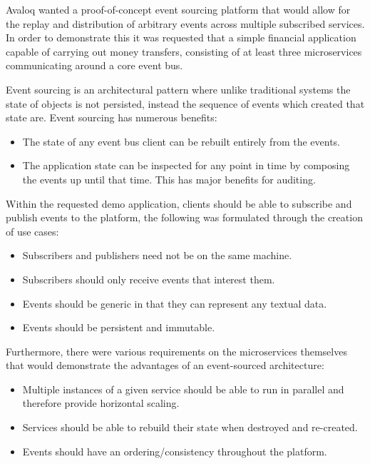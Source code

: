 \documentclass{l3proj}
\begin{document}
Avaloq wanted a proof-of-concept event sourcing platform that would allow for the replay and distribution of arbitrary events across multiple subscribed services. In order to demonstrate this it was requested that a simple financial application capable of carrying out money transfers, consisting of at least three microservices communicating around a core event bus.

Event sourcing is an architectural pattern where unlike traditional systems the state of objects is not persisted, instead the sequence of events which created that state are. Event sourcing has numerous benefits:

\begin{itemize}
    \item The state of any event bus client can be rebuilt entirely from the events.
    \item The application state can be inspected for any point in time by composing the events up until that time. This has major benefits for auditing.
\end{itemize}

Within the requested demo application, clients should be able to subscribe and publish events to the platform, the following was formulated through the creation of use cases:

\begin{itemize}
    \item Subscribers and publishers need not be on the same machine.
    \item Subscribers should only receive events that interest them.
    \item Events should be generic in that they can represent any textual data.
    \item Events should be persistent and immutable.
\end{itemize}

Furthermore, there were various requirements on the microservices themselves that would demonstrate the advantages of an event-sourced architecture:

\begin{itemize}
    \item Multiple instances of a given service should be able to run in parallel and therefore provide horizontal scaling.
    \item Services should be able to rebuild their state when destroyed and re-created.
    \item Events should have an ordering/consistency throughout the platform.
\end{itemize}
\end{document}
